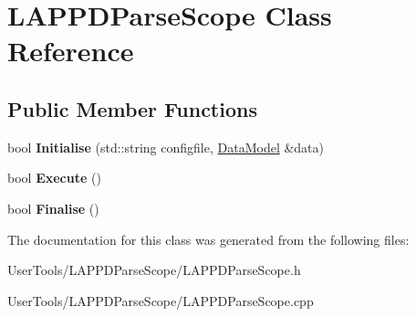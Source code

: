 \hypertarget{classLAPPDParseScope}{
\section{LAPPDParseScope Class Reference}
\label{classLAPPDParseScope}
}
\subsection*{Public Member Functions}
\begin{DoxyCompactItemize}
\item 
\hypertarget{classLAPPDParseScope_a5b2511aa79384f73240784028b39d427}{
bool {\bfseries Initialise} (std::string configfile, \hyperlink{classDataModel}{DataModel} \&data)}
\label{classLAPPDParseScope_a5b2511aa79384f73240784028b39d427}

\item 
\hypertarget{classLAPPDParseScope_ade2b40ff4ad384ab3778cb991bde62b6}{
bool {\bfseries Execute} ()}
\label{classLAPPDParseScope_ade2b40ff4ad384ab3778cb991bde62b6}

\item 
\hypertarget{classLAPPDParseScope_a7582fc226353ddceea5a73ff48d8c6a1}{
bool {\bfseries Finalise} ()}
\label{classLAPPDParseScope_a7582fc226353ddceea5a73ff48d8c6a1}

\end{DoxyCompactItemize}


The documentation for this class was generated from the following files:\begin{DoxyCompactItemize}
\item 
UserTools/LAPPDParseScope/LAPPDParseScope.h\item 
UserTools/LAPPDParseScope/LAPPDParseScope.cpp\end{DoxyCompactItemize}
